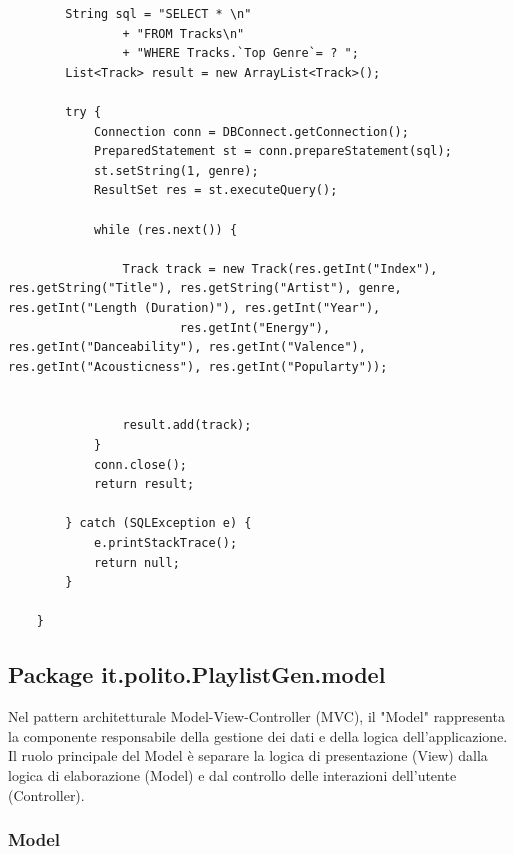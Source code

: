 \documentclass[12pt, a4paper]{article}
\begin{document}
\begin{itemize}
\begin{lstlisting}
		String sql = "SELECT * \n"
				+ "FROM Tracks\n"
				+ "WHERE Tracks.`Top Genre`= ? ";
		List<Track> result = new ArrayList<Track>();

		try {
			Connection conn = DBConnect.getConnection();
			PreparedStatement st = conn.prepareStatement(sql);
			st.setString(1, genre);
			ResultSet res = st.executeQuery();
			
			while (res.next()) {

				Track track = new Track(res.getInt("Index"), res.getString("Title"), res.getString("Artist"), genre, res.getInt("Length (Duration)"), res.getInt("Year"),
						res.getInt("Energy"), res.getInt("Danceability"), res.getInt("Valence"), res.getInt("Acousticness"), res.getInt("Popularty"));

				
				result.add(track);
			}
			conn.close();
			return result;
			
		} catch (SQLException e) {
			e.printStackTrace();
			return null;
		}
		
	}

\end{lstlisting}
\end{itemize}

\newpage
\subsection{Package it.polito.PlaylistGen.model}

Nel pattern architetturale Model-View-Controller (MVC),
il "Model" rappresenta la componente responsabile della gestione dei dati e della logica dell'applicazione.\\Il ruolo principale del Model è separare la logica di presentazione (View) dalla logica di elaborazione (Model) e dal controllo delle interazioni dell'utente (Controller).

\subsubsection{Model}
\end{document}
